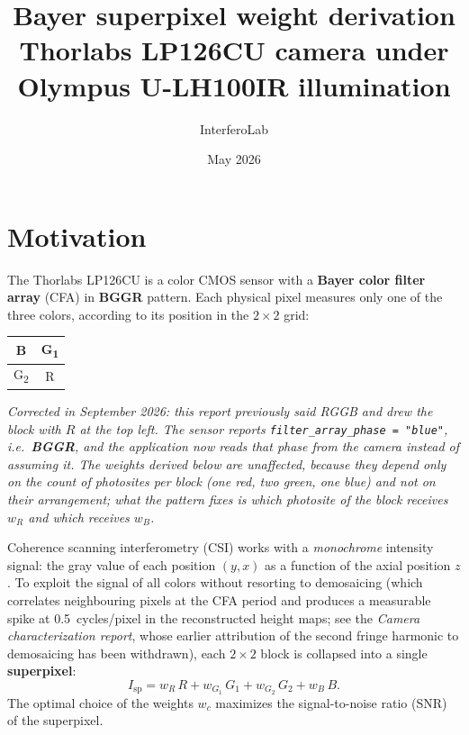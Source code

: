 \documentclass[11pt, a4paper]{article}
\title{\textbf{Bayer superpixel weight derivation}\\
       \large Thorlabs LP126CU camera under Olympus U-LH100IR illumination}
\author{InterferoLab}
\date{May 2026}
\begin{document}
\maketitle
\tableofcontents
\vspace{1em}

\section{Motivation}

The Thorlabs LP126CU is a color CMOS sensor with a \textbf{Bayer color
filter array} (CFA) in \textbf{BGGR} pattern\@. Each physical pixel measures only
one of the three colors, according to its position in the $2\times 2$
grid:

\begin{center}
\begin{tabular}{|c|c|}
\hline
B & G\textsubscript{1} \\
\hline
G\textsubscript{2} & R \\
\hline
\end{tabular}
\end{center}

\noindent\emph{Corrected in September 2026: this report previously said RGGB and
drew the block with $R$ at the top left. The sensor reports
\texttt{filter\_array\_phase = "blue"}, i.e.\ \textbf{BGGR}, and the application
now reads that phase from the camera instead of assuming it. The weights derived
below are unaffected, because they depend only on the \emph{count} of photosites
per block (one red, two green, one blue) and not on their arrangement; what the
pattern fixes is which photosite of the block receives $w_R$ and which receives
$w_B$.}

Coherence scanning interferometry (CSI) works with a \emph{monochrome}
intensity signal: the gray value of each position $(y,x)$ as a function
of the axial position $z$. To exploit the signal of all colors without
resorting to demosaicing (which correlates neighbouring pixels at the CFA
period and produces a measurable spike at 0.5~cycles/pixel in the reconstructed
height maps; see the \emph{Camera characterization report}, whose earlier
attribution of the second fringe harmonic to demosaicing has been
withdrawn), each $2\times 2$ block is
collapsed into a single \textbf{superpixel}:
\begin{equation}
  I_{\mathrm{sp}} = w_R\,R + w_{G_1}\,G_1 + w_{G_2}\,G_2 + w_B\,B.
  \label{eq:superpixel}
\end{equation}
The optimal choice of the weights $w_c$ maximizes the signal-to-noise
ratio (SNR) of the superpixel.
\end{document}
